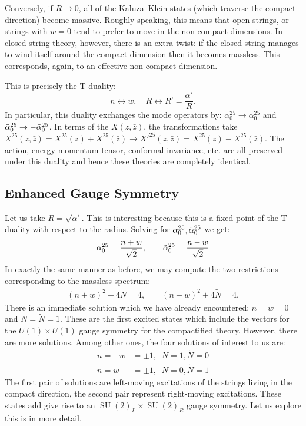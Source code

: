 \documentclass{report}
\theoremstyle{plain}
\theoremstyle{definition}
\theoremstyle{remark}
\newcommand{\FR}[2]{\frac{#1}{#2}}
\DeclareMathOperator{\SU}{SU}
\begin{document}
Conversely, if $R\to0$, all of the Kaluza--Klein states (which traverse the
compact direction) become massive. Roughly speaking, this means that open
strings, or strings with $w=0$ tend to prefer to move in the non-compact
dimensions. In closed-string theory, however, there is an extra twist: if
the closed string manages to wind itself around the compact dimension then
it becomes massless. This corresponds, again, to an effective non-compact
dimension.

This is precisely the T-duality: \[ n\leftrightarrow w, \quad R
\leftrightarrow R' = \FR{\alpha'}{R}.\]
In particular, this duality exchanges the mode operators by:
$\alpha_0^{25}\to\alpha_0^{25}$ and $\tilde\alpha_0^{25}\to-\tilde\alpha_0^{25}$.
In terms of the $X(z,\bar z)$, the transformations take $X^{25}(z,\bar z)
=X^{25}(z) + X^{25}(\bar z) \to X'^{25}(z,\bar z) = X^{25}(z)-X^{25}(\bar
z)$. The action, energy-momentum tensor, conformal invariance, etc. are all
preserved under this duality and hence these theories are completely
identical.

\subsection{Enhanced Gauge Symmetry}
Let us take $R = \sqrt{\alpha'}$. This is interesting because this is a
fixed point of the T-duality with respect to the radius. Solving for
$\alpha_0^{25},\tilde\alpha_0^{25}$ we get:
\begin{align*}
\alpha_0^{25} =\FR{n+w}{\sqrt 2}, \qquad \talpha_0^{25} =
\FR{n-w}{\sqrt 2}
\end{align*}
In exactly the same manner as before, we may compute the two restrictions
corresponding to the massless spectrum:
\begin{align*}
    (n+w)^2+4N = 4, \qquad (n-w)^2+4\tilde N = 4.
\end{align*}
There is an immediate solution which we have already encountered: $n=w=0$
and $N=\tilde N = 1$. These are the first excited states which include the
vectors for the $U(1)\times U(1)$ gauge symmetry for the compactified
theory. However, there are more solutions. Among other ones, the four
solutions of interest to us are:
\begin{align*}
    n=-w&=\pm 1,\;\; N=1, \tilde N = 0\\
    n=w&=\pm 1, \;\; N=0, \tilde N = 1
\end{align*}
The first pair of solutions are left-moving excitations of the strings
living in the compact direction, the second pair represent right-moving
excitations. These states add give rise to an $\SU(2)_L\times \SU(2)_R$
gauge symmetry. Let us explore this is in more detail.
\end{document}

